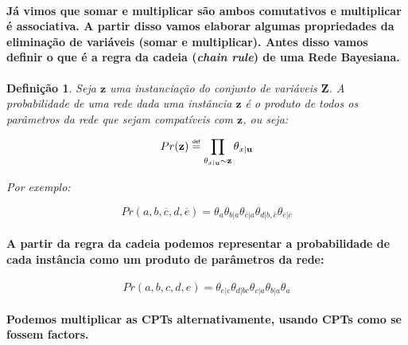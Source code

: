 \documentclass[a4paper,10pt]{article}
\newcommand\defeq{\mathrel{\overset{\makebox[0pt]{\mbox{\normalfont\tiny\sffamily def}}}{=}}}
\theoremstyle{plain}
\newtheorem*{spn-def}{Definição}
\begin{document}
\paragraph{
  Já vimos que somar e multiplicar são ambos comutativos e multiplicar é associativa. A partir 
disso vamos elaborar algumas propriedades da eliminação de variáveis (somar e multiplicar). Antes
disso vamos definir o que é a regra da cadeia (\textit{chain rule}) de uma Rede Bayesiana.
}

\begin{spn-def} Seja $\textbf{z}$ uma instanciação do conjunto de variáveis $\textbf{Z}$. A 
  probabilidade de uma rede dada uma instância $\textbf{z}$ é o produto de todos os parâmetros da
  rede que sejam compatíveis com $\textbf{z}$, ou seja:
  
  \begin{equation}
    Pr(\textbf{z}) \defeq \prod_{\theta_{x|\textbf{u}} \sim \textbf{z}} \theta_{x|\textbf{u}}
  \end{equation}

  Por exemplo:

  \begin{equation}
    Pr(a, b, \overline{c}, d, \overline{e}) = \theta_a \theta_{b|a} \theta_{\overline{c}|a} 
      \theta_{d|b,\overline{c}} \theta_{\overline{e}|\overline{c}}
  \end{equation}
\end{spn-def}

\paragraph{
  A partir da regra da cadeia podemos representar a probabilidade de cada instância como um
produto de parâmetros da rede:
}

\begin{equation}
  Pr(a, b, c, d, e) = \theta_{e|c} \theta_{d|bc} \theta_{c|a} \theta_{b|a} \theta_a
\end{equation}

\paragraph{
  Podemos multiplicar as CPTs\cite{report-1} alternativamente, usando CPTs como se fossem factors.
}

\newpage

\printbibliography
\end{document}
